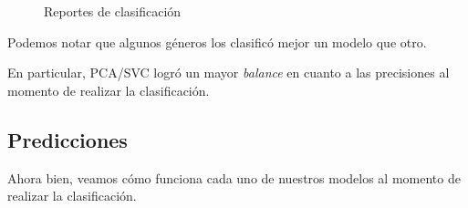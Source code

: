 \documentclass[letterpaper,11pt]{article}
\begin{document}
\begin{figure}[ht]
    \centering
    \qquad
    \caption{Reportes de clasificación}
    \label{fig: reportes}
\end{figure}

Podemos notar que algunos géneros los clasificó mejor un modelo que otro.

En particular, PCA/SVC logró un mayor \textit{balance} en cuanto a las 
precisiones al momento de realizar la clasificación.

\newpage
\subsection{Predicciones}

Ahora bien, veamos cómo funciona cada uno de nuestros modelos al momento de
realizar la clasificación.
\end{document}
